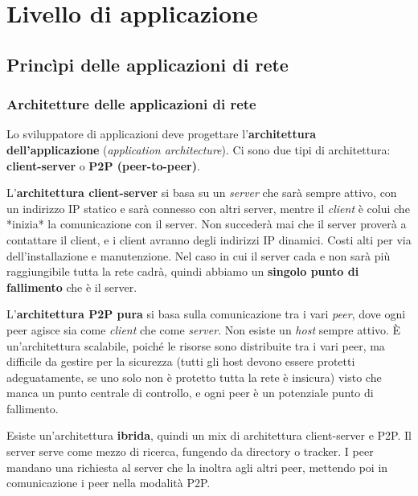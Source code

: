 \section{Livello di applicazione}

\subsection{Princìpi delle applicazioni di rete}

\subsubsection{Architetture delle applicazioni di rete}
Lo sviluppatore di applicazioni deve progettare l'\textbf{architettura dell'applicazione} (\textit{application architecture}). Ci sono due tipi di architettura: \textbf{client-server} o \textbf{P2P (peer-to-peer)}.

L'\textbf{architettura client-server} si basa su un \textit{server} che sarà sempre attivo, con un indirizzo IP statico e sarà connesso con altri server, mentre il \textit{client} è colui che *inizia* la comunicazione con il server. Non succederà mai che il server proverà a contattare il client, e i client avranno degli indirizzi IP dinamici. Costi alti per via dell'installazione e manutenzione. Nel caso in cui il server cada e non sarà più raggiungibile tutta la rete cadrà, quindi abbiamo un \textbf{singolo punto di fallimento} che è il server.

L'\textbf{architettura P2P pura} si basa sulla comunicazione tra i vari \textit{peer}, dove ogni peer agisce sia come \textit{client} che come \textit{server}. Non esiste un \textit{host} sempre attivo. È un'architettura scalabile, poiché le risorse sono distribuite tra i vari peer, ma difficile da gestire per la sicurezza (tutti gli host devono essere protetti adeguatamente, se uno solo non è protetto tutta la rete è insicura) visto che manca un punto centrale di controllo, e ogni peer è un potenziale punto di fallimento.

Esiste un'architettura \textbf{ibrida}, quindi un mix di architettura client-server e P2P. Il server serve come mezzo di ricerca, fungendo da directory o tracker. I peer mandano una richiesta al server che la inoltra agli altri peer, mettendo poi in comunicazione i peer nella modalità P2P.

